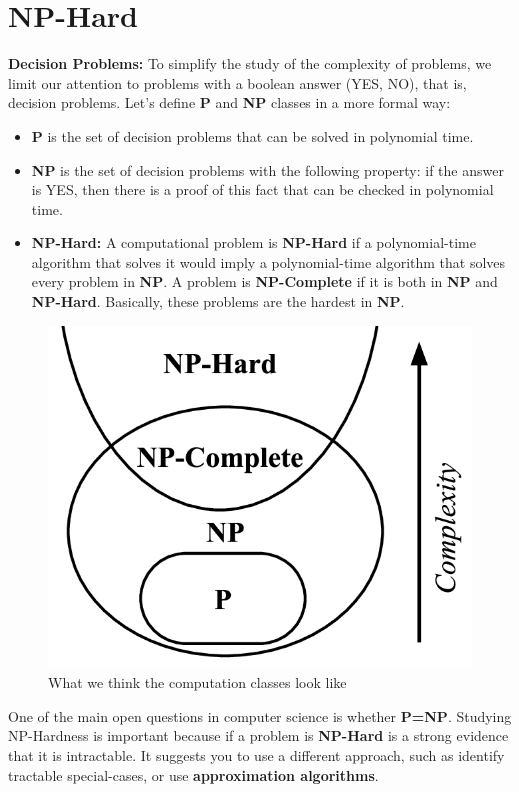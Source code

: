 \section{NP-Hard}
\textbf{Decision Problems:}\newline
To simplify the study of the complexity of problems, we limit our attention to problems with a boolean answer (YES, NO), that is, decision problems.\newline\newline
Let's define \textbf{P} and \textbf{NP} classes in a more formal way:
\begin{itemize}
    \item \textbf{P} is the set of decision problems that can be solved in polynomial time.

    \item \textbf{NP} is the set of decision problems with the following property: if the answer is YES, then there is a proof of this fact that can be checked in polynomial time.

    \item \textbf{NP-Hard:} A computational problem is \textbf{NP-Hard} if a polynomial-time algorithm that solves it would imply a polynomial-time algorithm that solves every problem in \textbf{NP}.\newline\newline
    A problem is \textbf{NP-Complete} if it is both in \textbf{NP} and \textbf{NP-Hard}. Basically, these problems are the hardest in \textbf{NP}. 
\end{itemize}
\begin{figure}[h]
    \centering
    \includegraphics[scale=0.4]{images/P-NP.png}
    \caption{What we think the computation classes look like}
    \label{fig:P-NP-Np-Hard}
\end{figure}
One of the main open questions in computer science is whether \textbf{P=NP}.\newline\newline
Studying NP-Hardness is important because if a problem is \textbf{NP-Hard} is a strong evidence that it is intractable. It suggests you to use a different approach, such as identify tractable special-cases, or use \textbf{approximation algorithms}.

